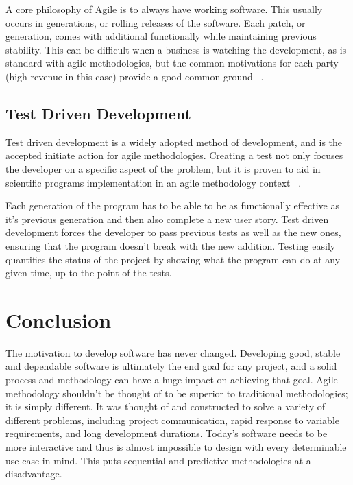 \documentclass[11pt]{article}
\newcommand{\tab}{\hspace*{2em}}
\begin{document}
\begin{doublespace}
\tab A core philosophy of Agile is to always have working software. This usually occurs in generations, or rolling releases of the software. Each patch, or generation, comes with additional functionally while maintaining previous stability. This can be difficult when a business is watching the development, as is standard with agile methodologies, but the common motivations for each party (high revenue in this case) provide a good common ground ~\cite{Ktata:2009:ADI:1557626.1557636}. 

\subsection{Test Driven Development}

\tab Test driven development is a widely adopted method of development, and is the accepted initiate action for agile methodologies. Creating a test not only focuses the developer on a specific aspect of the problem, but it is proven to aid in scientific programs implementation in an agile methodology context ~\cite{Sletholt:2011:LRA:1985782.1985784}. 

\tab Each generation of the program has to be able to be as functionally effective as it’s previous generation and then also complete a new user story. Test driven development forces the developer to pass previous tests as well as the new ones, ensuring that the program doesn’t break with the new addition. Testing easily quantifies the status of the project by showing what the program can do at any given time, up to the point of the tests.  

\section{Conclusion}

\tab The motivation to develop software has never changed. Developing good, stable and dependable software is ultimately the end goal for any project, and a solid process and methodology can have a huge impact on achieving that goal. Agile methodology shouldn’t be thought of to be superior to traditional methodologies; it is simply different. It was thought of and constructed to solve a variety of different problems, including project communication, rapid response to variable requirements, and long development durations. Today’s software needs to be more interactive and thus is almost impossible to design with every determinable use case in mind. This puts sequential and predictive methodologies at a disadvantage. 





\end{doublespace}
\end{document}
